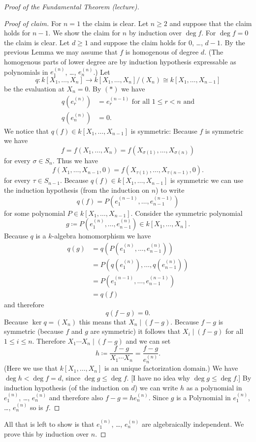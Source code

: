 \begin{proof}[Proof of the Fundamental Theorem (lecture)]
\begin{proof}[Proof of claim]
  For $n = 1$ the claim is clear. Let $n \geq 2$ and suppose that the claim holds for $n-1$. We show the claim for $n$ by induction over $\deg f$. For $\deg f = 0$ the claim is clear. Let $d \geq 1$ and suppose the claim holds for $0$, \dots, $d-1$. By the previous Lemma we may assume that $f$ is homogenous of degree $d$. (The homogenous parts of lower degree are by induction hypothesis expressable as polynomials in $e^{(n)}_1$, \dots, $e^{(n)}_n$.) Let
  \[
   q \colon k[X_1, \dotsc, X_n] \to k[X_1, \dotsc, X_n]/(X_n) \cong k[X_1, \dotsc, X_{n-1}]
  \]
  be the evaluation at $X_n = 0$. By $(\ast)$ we have
  \begin{align*}
   q\left( e^{(n)}_r \right) &= e^{(n-1)}_r \text{ for all } 1 \leq r < n \text{ and}\\
   q\left( e^{(n)}_n \right) &= 0.
  \end{align*}
  We notice that $q(f) \in k[X_1, \dotsc, X_{n-1}]$ is symmetric: Because $f$ is symmetric we have
  \[
   f = f(X_1, \dotsc, X_n) = f(X_{\sigma(1)}, \dotsc, X_{\sigma(n)})
  \]
  for every $\sigma \in S_n$. Thus we have
  \[
   f(X_1, \dotsc, X_{n-1}, 0) = f(X_{\tau(1)}, \dotsc, X_{\tau(n-1)}, 0).
  \]
  for every $\tau \in S_{n-1}$. Because $q(f) \in k[X_1, \dotsc, X_{n-1}]$ is symmetric we can use the induction hypothesis (from the induction on $n$) to write
  \[
   q(f) = P\left(e^{(n-1)}_1, \dotsc, e^{(n-1)}_{n-1}\right)
  \]
  for some polynomial $P \in k[X_1, \dotsc, X_{n-1}]$. Consider the symmetric polynomial
  \[
   g \coloneqq P\left(e^{(n)}_1, \dotsc, e^{(n)}_{n-1}\right) \in k[X_1, \dotsc, X_n].
  \]
  Because $q$ is a $k$-algebra homomorphism we have
  \begin{align*}
   q(g)
   &= q\left( P\left(e^{(n)}_1, \dotsc, e^{(n)}_{n-1}\right) \right) \\
   &= P\left( q\left(e^{(n)}_1\right), \dotsc, q\left(e^{(n)}_{n-1}\right) \right) \\
   &= P\left( e^{(n-1)}_1, \dotsc, e^{(n-1)}_{n-1} \right) \\
   &= q(f)
  \end{align*}
  and therefore
  \[
   q(f-g) = 0.
  \]
  Because $\ker q = (X_n)$ this means that $X_n \mid (f-g)$. Because $f-g$ is symmetric (because $f$ and $g$ are symmetric) it follows that $X_i \mid (f-g)$ for all $1 \leq i \leq n$. Therefore $X_1 \dotsm X_n \mid (f-g)$ and we can set
  \[
   h \coloneqq \frac{f-g}{X_1 \dotsm X_n} = \frac{f-g}{e^{(n)}_n}.
  \]
  (Here we use that $k[X_1, \dotsc, X_n]$ is an unique factorization domain.) We have $\deg h < \deg f = d$, since $\deg g \leq \deg f$. [I have no idea why $\deg g \leq \deg f$.] By induction hypothesis (of the induction on $d$) we can write $h$ as a polynomial in $e^{(n)}_1$, \dots, $e^{(n)}_n$ and therefore also $f-g = h e^{(n)}_n$. Since $g$ is a Polynomial in $e^{(n)}_1$, \dots, $e^{(n)}_n$ so is $f$.
 \end{proof}
 All that is left to show is that $e^{(n)}_1$, \dots, $e^{(n)}_n$ are algebraically independent. We prove this by induction over $n$.
 

\end{proof}
